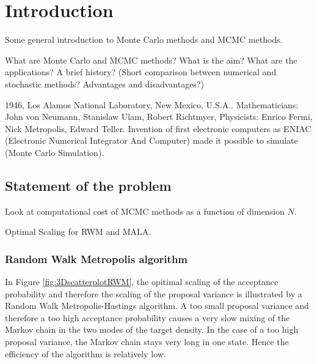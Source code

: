 \section{Introduction}
\label{sec:introduction}


Some general introduction to Monte Carlo methods and MCMC methods.

What are Monte Carlo and MCMC methods? What is the aim? What are the applications? A brief history? (Short comparison between numerical and stochastic methods? Advantages and disadvantages?)
\newline

1946, Los Alamos National Laboratory, New Mexico, U.S.A.. Mathematicians: John von Neumann, Stanislaw Ulam, Robert Richtmyer, Physicists: Enrico Fermi, Nick Metropolis, Edward Teller.
Invention of first electronic computers as ENIAC (Electronic Numerical Integrator And Computer) made it possible to simulate (Monte Carlo Simulation).

\subsection*{Statement of the problem}

Look at computational cost of MCMC methods as a function of dimension $ N $.

Optimal Scaling for RWM and MALA. 

\subsubsection*{Random Walk Metropolis algorithm}

In Figure \ref{fig:3DscatterplotRWM}, the opitimal scaling of the acceptance probability and therefore the scaling of the proposal variance is illustrated by a Random Walk Metropolis-Hastings algorithm. A too small proposal variance and therefore a too high acceptance probability causes a very slow mixing of the Markov chain in the two modes of the target density. In the case of a too high proposal variance, the Markov chain stays very long in one state. Hence the efficiency of the algorithm is relatively low.



